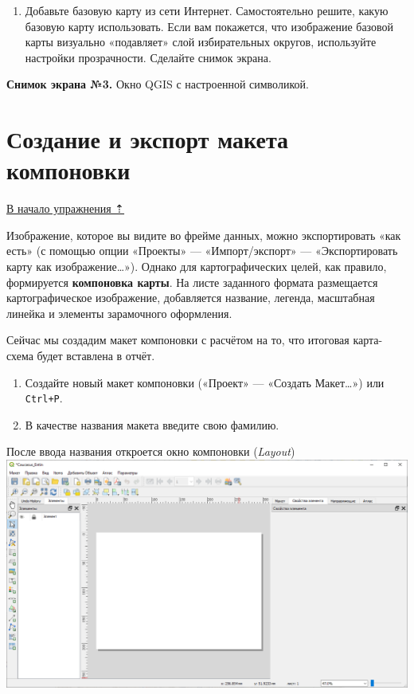 \documentclass[
  12pt,
]{book}
\providecommand{\tightlist}{%
  \setlength{\itemsep}{0pt}\setlength{\parskip}{0pt}}
\begin{document}
\begin{enumerate}
\def\labelenumi{\arabic{enumi}.}
\setcounter{enumi}{10}
\tightlist
\item
  Добавьте базовую карту из сети Интернет. Самостоятельно решите, какую базовую карту использовать. Если вам покажется, что изображение базовой карты визуально «подавляет» слой избирательных округов, используйте настройки прозрачности. Сделайте снимок экрана.
\end{enumerate}

\textbf{Снимок экрана №3.} Окно QGIS с настроенной символикой.

\hypertarget{digitizing-layout}{%
\section{Создание и экспорт макета компоновки}\label{digitizing-layout}}

\protect\hyperlink{digitizing-districts}{В начало упражнения ⇡}

Изображение, которое вы видите во фрейме данных, можно экспортировать «как есть» (с помощью опции «Проекты» --- «Импорт/экспорт» --- «Экспортировать карту как изображение\ldots»). Однако для картографических целей, как правило, формируется \textbf{компоновка карты}. На листе заданного формата размещается картографическое изображение, добавляется название, легенда, масштабная линейка и элементы зарамочного оформления.

Сейчас мы создадим макет компоновки с расчётом на то, что итоговая карта-схема будет вставлена в отчёт.

\begin{enumerate}
\def\labelenumi{\arabic{enumi}.}
\item
  Создайте новый макет компоновки («Проект» --- «Создать Макет\ldots») или \texttt{Ctrl+P}.
\item
  В качестве названия макета введите свою фамилию.
\end{enumerate}

После ввода названия откроется окно компоновки (\emph{Layout}) \includegraphics{images/Ex01/Layout.png}
\end{document}
